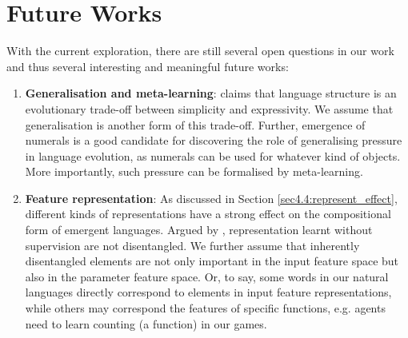 \section{Future Works}
\label{sec5.2:future_work}

With the current exploration, there are still several open questions in our work and thus several interesting and meaningful future works:

\begin{enumerate}
    \item \textbf{Generalisation and meta-learning}: \cite{smith2013linguistic} claims that language structure is an evolutionary trade-off between simplicity and expressivity. We assume that generalisation is another form of this trade-off. Further, emergence of numerals is a good candidate for discovering the role of generalising pressure in language evolution, as numerals can be used for whatever kind of objects. More importantly, such pressure can be formalised by meta-learning.
    \item \textbf{Feature representation}: As discussed in Section \ref{sec4.4:represent_effect}, different kinds of representations have a strong effect on the compositional form of emergent languages. Argued by \cite{locatello2018challenging}, representation learnt without supervision are not disentangled. We further assume that inherently disentangled elements are not only important in the input feature space but also in the parameter feature space. Or, to say, some words in our natural languages directly correspond to elements in input feature representations, while others may correspond the features of specific functions, e.g. agents need to learn counting (a function) in our games.
\end{enumerate}